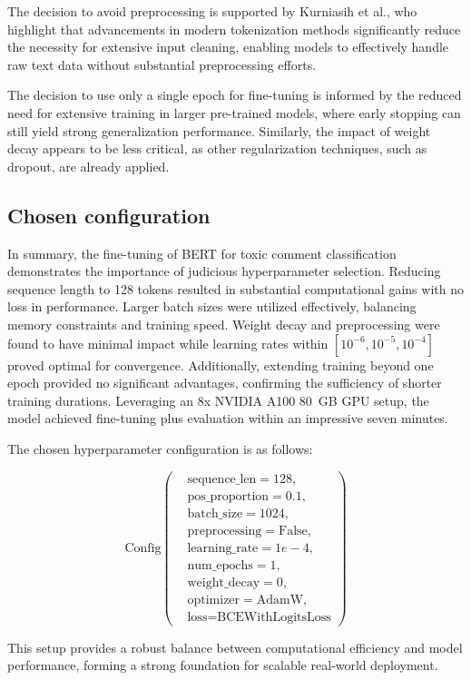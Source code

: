 The decision to avoid preprocessing is supported by Kurniasih et al., who highlight that advancements in modern tokenization methods significantly reduce the necessity for extensive input cleaning, enabling models to effectively handle raw text data without substantial preprocessing efforts. \cite{Kurniasih2022}

The decision to use only a single epoch for fine-tuning is informed by the reduced need for extensive training in larger pre-trained models, where early stopping can still yield strong generalization performance. Similarly, the impact of weight decay appears to be less critical, as other regularization techniques, such as dropout, are already applied. \cite{Kundu2023,vaswani2017attention}


\subsection{Chosen configuration}\label{subsec:chosen_configuration}
In summary, the fine-tuning of BERT for toxic comment classification demonstrates the importance of judicious hyperparameter selection. Reducing sequence length to 128 tokens resulted in substantial computational gains with no loss in performance. Larger batch sizes were utilized effectively, balancing memory constraints and training speed. Weight decay and preprocessing were found to have minimal impact while learning rates within \([10^{-6},10^{-5}, 10^{-4}]\) proved optimal for convergence. Additionally, extending training beyond one epoch provided no significant advantages, confirming the sufficiency of shorter training durations. Leveraging an 8x NVIDIA A100 80~GB GPU setup, the model achieved fine-tuning plus evaluation within an impressive seven minutes. 

\noindent The chosen hyperparameter configuration is as follows:

\[
\text{Config}\left(
\begin{aligned}
    &\text{sequence\_len} = 128, \\
    &\text{pos\_proportion} = 0.1, \\
    &\text{batch\_size} = 1024, \\
    &\text{preprocessing} = \text{False}, \\
    &\text{learning\_rate} = 1e-4, \\
    &\text{num\_epochs} = 1, \\
    &\text{weight\_decay} = 0, \\
    &\text{optimizer} = \text{AdamW}, \\
    &\text{loss} = \text{BCEWithLogitsLoss}
\end{aligned}
\right)
\]

\noindent This setup provides a robust balance between computational efficiency and model performance, forming a strong foundation for scalable real-world deployment.


